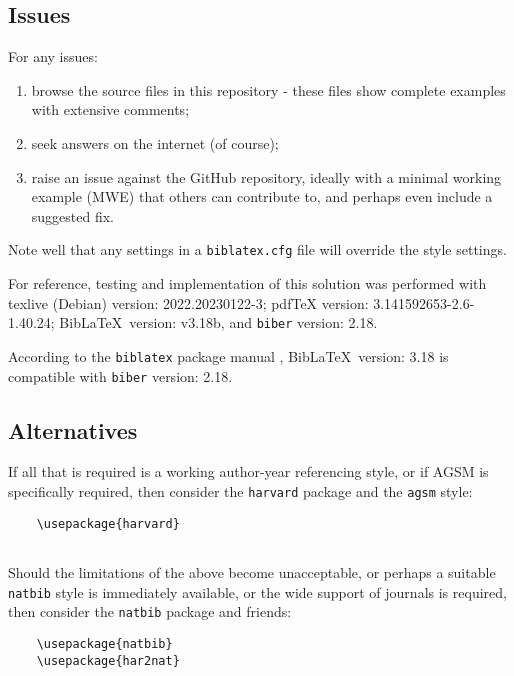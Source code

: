 \documentclass[a4paper, 11pt]{article}
\newcommand*{\BibLaTeX}{Bib\LaTeX}
\begin{document}
\subsection{Issues}

For any issues:

\begin{enumerate}
\item browse the source files in this repository - these files show complete examples with extensive comments;
\item seek answers on the internet (of course);
\item raise an issue against the GitHub repository, ideally with a minimal working example (MWE)
that others can contribute to, and perhaps even include a suggested fix.
\end{enumerate}

Note well that any settings in a \texttt{biblatex.cfg} file will override the style settings.

\medskip
\noindent
For reference, testing and implementation of this solution was performed with texlive (Debian)
version: 2022.20230122-3; pdfTeX version: 3.141592653-2.6-1.40.24; \BibLaTeX\ version: v3.18b, and
\texttt{biber} version: 2.18.

According to the \texttt{biblatex} package manual \autocite[8]{LehmanEtAl2012biblatPackag},
\BibLaTeX\ version: 3.18 is compatible with \texttt{biber} version: 2.18.

\subsection{Alternatives}
\label{subsec:Alternatives}

If all that is required is a working author-year referencing style, or if AGSM is specifically
required, then consider the \texttt{harvard} package and the \texttt{agsm} style:

\begin{verbatim}
    \usepackage{harvard}
    
\end{verbatim}

Should the limitations of the above become unacceptable, or perhaps a suitable \texttt{natbib} style
is immediately available, or the wide support of journals is required, then consider the
\texttt{natbib} package and friends:

\begin{verbatim}
    \usepackage{natbib}
    \usepackage{har2nat}
    
\end{verbatim}
\end{document}

